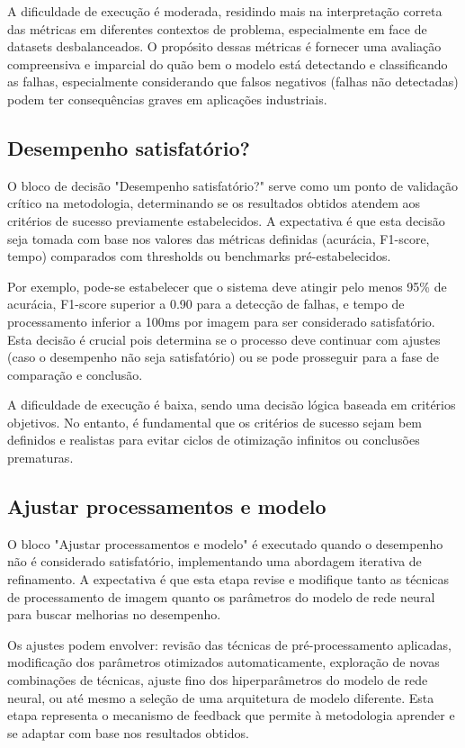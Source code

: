 A dificuldade de execução é moderada, residindo mais na interpretação correta das métricas em diferentes contextos de problema, especialmente em face de datasets desbalanceados. O propósito dessas métricas é fornecer uma avaliação compreensiva e imparcial do quão bem o modelo está detectando e classificando as falhas, especialmente considerando que falsos negativos (falhas não detectadas) podem ter consequências graves em aplicações industriais.

\subsection{Desempenho satisfatório?}
O bloco de decisão "Desempenho satisfatório?" serve como um ponto de validação crítico na metodologia, determinando se os resultados obtidos atendem aos critérios de sucesso previamente estabelecidos. A expectativa é que esta decisão seja tomada com base nos valores das métricas definidas (acurácia, F1-score, tempo) comparados com thresholds ou benchmarks pré-estabelecidos.

Por exemplo, pode-se estabelecer que o sistema deve atingir pelo menos 95\% de acurácia, F1-score superior a 0.90 para a detecção de falhas, e tempo de processamento inferior a 100ms por imagem para ser considerado satisfatório. Esta decisão é crucial pois determina se o processo deve continuar com ajustes (caso o desempenho não seja satisfatório) ou se pode prosseguir para a fase de comparação e conclusão.

A dificuldade de execução é baixa, sendo uma decisão lógica baseada em critérios objetivos. No entanto, é fundamental que os critérios de sucesso sejam bem definidos e realistas para evitar ciclos de otimização infinitos ou conclusões prematuras.

\subsection{Ajustar processamentos e modelo}
O bloco "Ajustar processamentos e modelo" é executado quando o desempenho não é considerado satisfatório, implementando uma abordagem iterativa de refinamento. A expectativa é que esta etapa revise e modifique tanto as técnicas de processamento de imagem quanto os parâmetros do modelo de rede neural para buscar melhorias no desempenho.

Os ajustes podem envolver: revisão das técnicas de pré-processamento aplicadas, modificação dos parâmetros otimizados automaticamente, exploração de novas combinações de técnicas, ajuste fino dos hiperparâmetros do modelo de rede neural, ou até mesmo a seleção de uma arquitetura de modelo diferente. Esta etapa representa o mecanismo de feedback que permite à metodologia aprender e se adaptar com base nos resultados obtidos.

